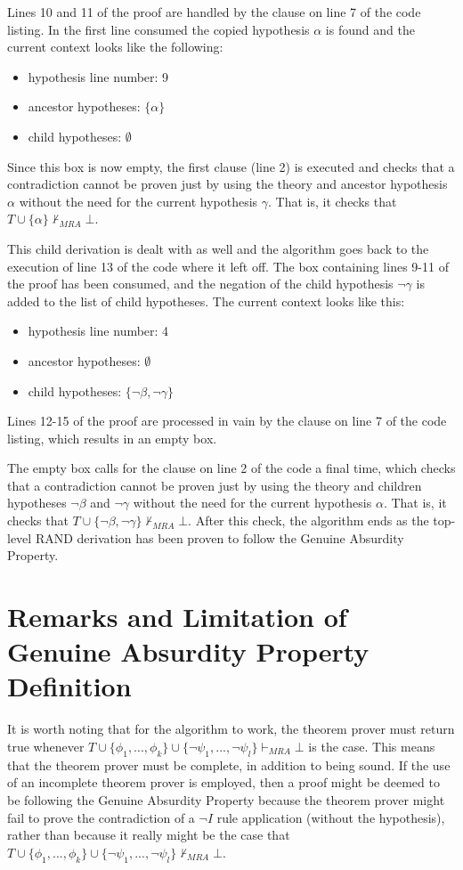 \documentclass[11pt,twoside,a4paper]{report}
\begin{document}
Lines 10 and 11 of the proof are handled by the clause on line 7 of the code listing. In the first line consumed the copied hypothesis $\alpha$ is found and the current context looks like the following: 
\begin{itemize}
\item
hypothesis line number: 9
\item
ancestor hypotheses: $\{\alpha\}$
\item
child hypotheses: $\emptyset$
\end{itemize}

Since this box is now empty, the first clause (line 2) is executed and checks that a contradiction cannot be proven just by using the theory and ancestor hypothesis $\alpha$ without the need for the current hypothesis $\gamma$. That is, it checks that $T\cup\{\alpha\}\nvdash_{MRA}\bot$.

This child derivation is dealt with as well and the algorithm goes back to the execution of line 13 of the code where it left off. The box containing lines 9-11 of the proof has been consumed, and the negation of the child hypothesis $\neg\gamma$ is added to the list of child hypotheses. The current context looks like this:
\begin{itemize}
\item
hypothesis line number: 4
\item
ancestor hypotheses: $\emptyset$
\item
child hypotheses: $\{\neg\beta, \neg\gamma\}$
\end{itemize}

Lines 12-15 of the proof are processed in vain by the clause on line 7 of the code listing, which results in an empty box.

The empty box calls for the clause on line 2 of the code a final time, which checks that a contradiction cannot be proven just by using the theory and children hypotheses $\neg\beta$ and $\neg\gamma$ without the need for the current hypothesis $\alpha$. That is, it checks that $T\cup\{\neg\beta, \neg\gamma\}\nvdash_{MRA}\bot$. After this check, the algorithm ends as the top-level RAND derivation has been proven to follow the Genuine Absurdity Property.

\section{Remarks and Limitation of Genuine Absurdity Property Definition}
It is worth noting that for the algorithm to work, the theorem prover must return true whenever $T\cup\{\phi_1, ..., \phi_k\}\cup\{\neg\psi_1, ..., \neg\psi_l\}\vdash_{MRA}\bot$ is the case. This means that the theorem prover must be complete, in addition to being sound. If the use of an incomplete theorem prover is employed, then a proof might be deemed to be following the Genuine Absurdity Property because the theorem prover might fail to prove the contradiction of a $\neg I$ rule application (without the hypothesis), rather than because it really might be the case that $T\cup\{\phi_1, ..., \phi_k\}\cup\{\neg\psi_1, ..., \neg\psi_l\}\nvdash_{MRA}\bot$. 
\end{document}
